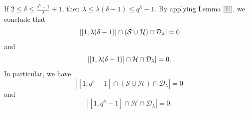 \documentclass[journal,onecolumn]{IEEEtran}
\begin{document}
If $2\leq \delta\leq \frac{q^h-1}{\lambda}+1$, then $\lambda\leq \lambda(\delta-1)\leq q^h-1$. By applying Lemma \ref{lll}, we  conclude that 
\begin{equation}\notag
    \left|\left[1,\lambda(\delta-1)\right] \cap(\mathcal{S}\cup \mathcal{H})\cap \mathcal{D}_{\lambda}  \right|=0
\end{equation}
and 
\begin{equation}\notag
       \left|\left[1,\lambda(\delta-1)\right] \cap \mathcal{H} \cap \mathcal{D}_{\lambda}  \right|=0.
\end{equation}
In particular, we have  
\begin{equation}\label{p1}
    \left|\left[1,q^h-1\right] \cap(\mathcal{S}\cup \mathcal{H})\cap \mathcal{D}_{\lambda}  \right|=0 
\end{equation}
and
\begin{equation}\label{p2}
       \left|\left[1, q^h-1\right] \cap \mathcal{H} \cap \mathcal{D}_{\lambda}  \right|=0.
\end{equation}
\end{document}
